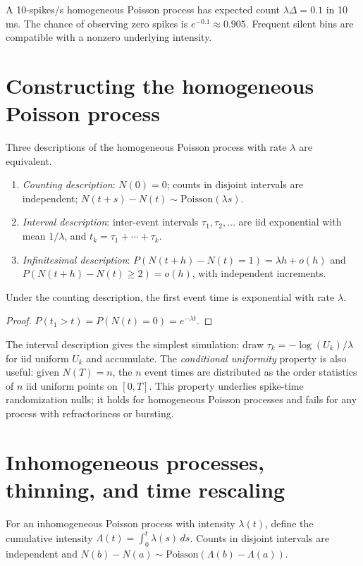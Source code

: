 \begin{workedexample}
A 10-spikes/s homogeneous Poisson process has expected count $\lambda\Delta=0.1$ in 10 ms. The chance of observing zero spikes is $e^{-0.1}\approx0.905$. Frequent silent bins are compatible with a nonzero underlying intensity.
\end{workedexample}
\section{Constructing the homogeneous Poisson process}
Three descriptions of the homogeneous Poisson process with rate $\lambda$ are equivalent.
\begin{enumerate}[leftmargin=2em]
\item \emph{Counting description}: $N(0)=0$; counts in disjoint intervals are independent; $N(t+s)-N(t)\sim\mathrm{Poisson}(\lambda s)$.
\item \emph{Interval description}: inter-event intervals $\tau_1,\tau_2,\ldots$ are iid exponential with mean $1/\lambda$, and $t_k=\tau_1+\cdots+\tau_k$.
\item \emph{Infinitesimal description}: $P(N(t+h)-N(t)=1)=\lambda h+o(h)$ and $P(N(t+h)-N(t)\ge2)=o(h)$, with independent increments.
\end{enumerate}
\begin{proposition}
Under the counting description, the first event time is exponential with rate $\lambda$.
\end{proposition}
\begin{proof}
$P(t_1>t)=P(N(t)=0)=e^{-\lambda t}$.
\end{proof}
The interval description gives the simplest simulation: draw $\tau_k=-\log(U_k)/\lambda$ for iid uniform $U_k$ and accumulate. The \emph{conditional uniformity} property is also useful: given $N(T)=n$, the $n$ event times are distributed as the order statistics of $n$ iid uniform points on $[0,T]$. This property underlies spike-time randomization nulls; it holds for homogeneous Poisson processes and fails for any process with refractoriness or bursting.

\section{Inhomogeneous processes, thinning, and time rescaling}
For an inhomogeneous Poisson process with intensity $\lambda(t)$, define the cumulative intensity $\Lambda(t)=\int_0^t\lambda(s)\,ds$. Counts in disjoint intervals are independent and $N(b)-N(a)\sim\mathrm{Poisson}(\Lambda(b)-\Lambda(a))$.

